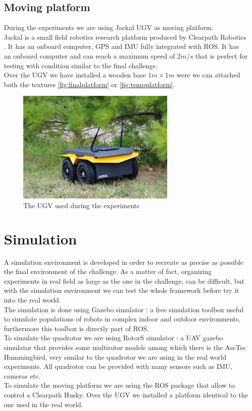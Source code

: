 \subsection{Moving platform}
During the experiments we are using Jackal UGV as moving platform.\\ 
Jackal is a small field robotics research platform produced by Clearpath Robotics \cite{clearpathrobotics}. 
It has an onboard computer, GPS and IMU fully integrated with ROS. It has an onboard computer and can reach a maximum speed of $2m/s$ that is perfect for testing with condition similar to the final challenge.\\
Over the UGV we have installed a wooden base $1m \times 1m$ were we can attached both the textures     \ref{fig:finalplatform} or \ref{fig:tempplatform}.
\begin{figure}[!ht]
    \centering
    \includegraphics[width=0.7\textwidth]{img/jackal.jpg}
    \caption{The UGV used during the experiments}
    \label{fig:quad_hardware}
\end{figure}

\section{Simulation}
A simulation environment is developed in order to recreate as precise as possible the final environment of the challenge.  As a matter of fact, organizing experiments in real field as large as the one in the challenge, can be difficult, but with the simulation environment we can test the whole framework before try it into the real world.\\
The simulation is done using Gazebo simulator \cite{gazebosimulator}: a free simulation toolbox useful to simulate populations of robots in complex indoor and outdoor environments, furthermore this toolbox is directly part of ROS.\\
To simulate the quadrotor we are using RotorS simulator \cite{rotors2016}: a UAV gazebo simulator that provides some multirotor models among which there is the AscTec Hummingbird, very similar to the quadrotor we are using in the real world experiments. All quadrotor can be provided with many sensors such as IMU, cameras etc. \\
To simulate the moving platform we are using the ROS package \cite{RobotsHusky} that allow to control a Clearpath Husky. Over the UGV we installed a platform identical to the one used in the real world.

